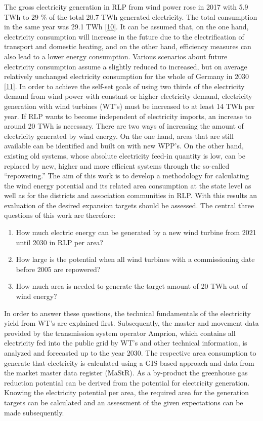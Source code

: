 \documentclass[a4paper,11pt]{article}
\begin{document}
The gross electricity generation in RLP from wind power rose in 2017 with 5.9 TWh to 29 \% of the total 20.7 TWh generated electricity. The total consumption in the same year was 29.1 TWh {[}\protect\hyperlink{ref-Lehnert.2020}{10}{]}. It can be assumed that, on the one hand, electricity consumption will increase in the future due to the electrification of transport and domestic heating, and on the other hand, efficiency measures can also lead to a lower energy consumption. Various scenarios about future electricity consumption assume a slightly reduced to increased, but on average relatively unchanged electricity consumption for the whole of Germany in 2030 {[}\protect\hyperlink{ref-NormanGerhardt.2015}{11}{]}. In order to achieve the self-set goals of using two thirds of the electricity demand from wind power with constant or higher electricity demand, electricity generation with wind turbines (WT's) must be increased to at least 14 TWh per year. If RLP wants to become independent of electricity imports, an increase to around 20 TWh is necessary. There are two ways of increasing the amount of electricity generated by wind energy. On the one hand, areas that are still available can be identified and built on with new WPP's. On the other hand, existing old systems, whose absolute electricity feed-in quantity is low, can be replaced by new, higher and more efficient systems through the so-called ``repowering.''
The aim of this work is to develop a methodology for calculating the wind energy potential and its related area consumption at the state level as well as for the districts and association communities in RLP. With this results an evaluation of the desired expansion targets should be assessed. The central three questions of this work are therefore:
\begin{enumerate}
\def\labelenumi{\arabic{enumi}.}
\item
  How much electric energy can be generated by a new wind turbine from 2021 until 2030 in RLP per area?
\item
  How large is the potential when all wind turbines with a commissioning date before 2005 are repowered?
\item
  How much area is needed to generate the target amount of 20 TWh out of wind energy?
\end{enumerate}
In order to answer these questions, the technical fundamentals of the electricity yield from WT's are explained first. Subsequently, the master and movement data provided by the transmission system operator Amprion, which contains all electricity fed into the public grid by WT's and other technical information, is analyzed and forecasted up to the year 2030. The respective area consumption to generate that electricity is calculated using a GIS based approach and data from the market master data register (MaStR). As a by-product the greenhouse gas reduction potential can be derived from the potential for electricity generation. Knowing the electricity potential per area, the required area for the generation targets can be calculated and an assessment of the given expectations can be made subsequently.
\end{document}
